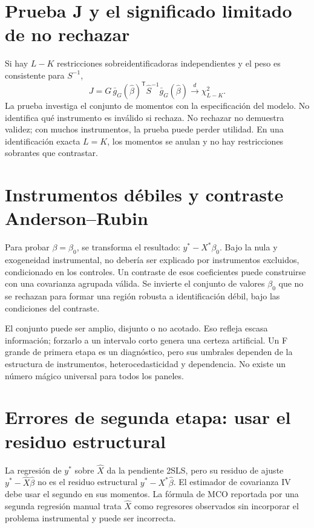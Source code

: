 \documentclass[11pt,a4paper]{article}
\newcommand{\T}{^{\mathsf T}}
\theoremstyle{definition}
\newcounter{problema}
\begin{document}
\section{Prueba J y el significado limitado de no rechazar}
Si hay $L-K$ restricciones sobreidentificadoras independientes y el peso es consistente para $S^{-1}$,
\[
J=G\,\bar g_G(\widehat\beta)\T\widehat S^{-1}\bar g_G(\widehat\beta)
\overset d\longrightarrow\chi_{L-K}^2.
\]
La prueba investiga el conjunto de momentos con la especificación del modelo.
No identifica qué instrumento es inválido si rechaza.
No rechazar no demuestra validez; con muchos instrumentos, la prueba puede perder utilidad.
En una identificación exacta $L=K$, los momentos se anulan y no hay restricciones sobrantes que contrastar.

\section{Instrumentos débiles y contraste Anderson--Rubin}
Para probar $\beta=\beta_0$, se transforma el resultado:
$y^*-X^*\beta_0$.
Bajo la nula y exogeneidad instrumental, no debería ser explicado por instrumentos excluidos, condicionado en los controles.
Un contraste de esos coeficientes puede construirse con una covarianza agrupada válida. Se invierte el conjunto de valores $\beta_0$ que no se rechazan para formar una región robusta a identificación débil, bajo las condiciones del contraste.

El conjunto puede ser amplio, disjunto o no acotado. Eso refleja escasa información; forzarlo a un intervalo corto genera una certeza artificial.
Un F grande de primera etapa es un diagnóstico, pero sus umbrales dependen de la estructura de instrumentos, heterocedasticidad y dependencia. No existe un número mágico universal para todos los paneles.

\section{Errores de segunda etapa: usar el residuo estructural}
La regresión de $y^*$ sobre $\widehat X$ da la pendiente 2SLS, pero su residuo de ajuste
$y^*-\widehat X\widehat\beta$ no es el residuo estructural
$y^*-X^*\widehat\beta$.
El estimador de covarianza IV debe usar el segundo en sus momentos.
La fórmula de MCO reportada por una segunda regresión manual trata $\widehat X$ como regresores observados sin incorporar el problema instrumental y puede ser incorrecta.
\end{document}
